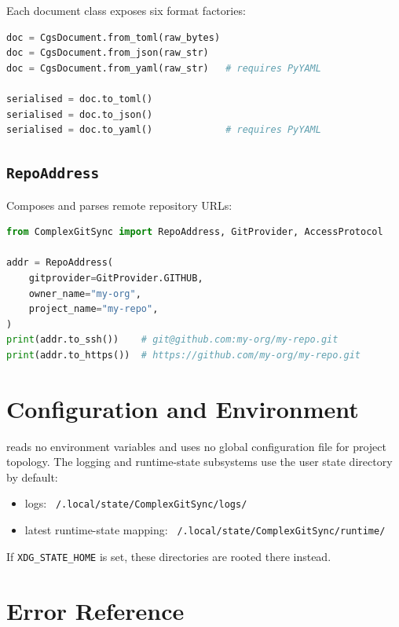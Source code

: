 \documentclass[11pt,a4paper]{article}
\begin{document}
Each document class exposes six format factories:

\begin{lstlisting}[language=Python]
doc = CgsDocument.from_toml(raw_bytes)
doc = CgsDocument.from_json(raw_str)
doc = CgsDocument.from_yaml(raw_str)   # requires PyYAML

serialised = doc.to_toml()
serialised = doc.to_json()
serialised = doc.to_yaml()             # requires PyYAML
\end{lstlisting}

\subsection{\texttt{RepoAddress}}

Composes and parses remote repository URLs:

\begin{lstlisting}[language=Python]
from ComplexGitSync import RepoAddress, GitProvider, AccessProtocol

addr = RepoAddress(
    gitprovider=GitProvider.GITHUB,
    owner_name="my-org",
    project_name="my-repo",
)
print(addr.to_ssh())    # git@github.com:my-org/my-repo.git
print(addr.to_https())  # https://github.com/my-org/my-repo.git
\end{lstlisting}

\section{Configuration and Environment}

\cgspkg{} reads no environment variables and uses no global configuration
file for project topology. The logging and runtime-state subsystems use the
user state directory by default:

\begin{itemize}
  \item logs: \texttt{~/.local/state/ComplexGitSync/logs/}
  \item latest runtime-state mapping:
        \texttt{~/.local/state/ComplexGitSync/runtime/}
\end{itemize}

If \texttt{XDG\_STATE\_HOME} is set, these directories are rooted there
instead.

\section{Error Reference}
\end{document}
